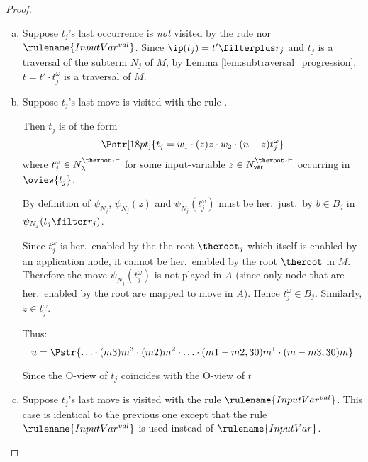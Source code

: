 \begin{proof}
\begin{enumerate}[$\bullet$]
\begin{enumerate}
\begin{enumerate}[-]
    \begin{enumerate}[(a)]
    \item  Suppose $t_j$'s last occurrence is \emph{not}  visited by the rule  nor $\rulename{InputVar^{val}}$.
         Since $\ip(t_j) = t' \filterplus r_j$ and
        $t_j$ is a traversal of the subterm $N_j$ of
        $M$, by Lemma
        \ref{lem:subtraversal_progression}, $t = t'
        \cdot t_j^\omega$ is a traversal of $M$.

    \item Suppose $t_j$'s last move is visited with the rule .

    Then $t_j$ is of the form
    $$\Pstr[18pt]{ t_j = w_1 \cdot (z)z \cdot w_2 \cdot (n-z){t_j^\omega}}$$
where $t_j^\omega \in N_\lambda^{\theroot_j\vdash}$
for some input-variable $z \in
N^{\theroot_j\vdash}_{\sf var}$ occurring in
$\oview{t_j}$.

By definition of $\psi_{N_j}$, $\psi_{N_j}(z)$ and
$\psi_{N_j}(t_j^\omega)$ must be her.\ just.\ by $b
\in B_j$ in $\psi_{N_j}(t_j\filter r_j)$.



Since $t_j^\omega$ is her.\ enabled by the the root
$\theroot_j$ which itself is enabled by an
application node, it cannot be her.\ enabled by the
root $\theroot$ in $M$. Therefore the move
$\psi_{N_j}(t_j^\omega)$ is not played in $A$ (since
only node that are her.\ enabled by the root are
mapped to move in $A$). Hence $t_j^\omega \in B_j$.
Similarly, $z \in t_j^\omega$.

Thus:
$$u = \Pstr{ \ldots \cdot (m3){m^3} \cdot
                (m2){m^2} \cdot \ldots \cdot
                (m1-m2,30){m^1} \cdot (m-m3,30){m} } $$






Since the O-view of $t_j$ coincides with the O-view
of $t$

    \item Suppose $t_j$'s last move is visited with the rule $\rulename{InputVar^{val}}$.
    This case is identical to the previous one
    except that the rule $\rulename{InputVar^{val}}$
    is used instead of $\rulename{InputVar}$.
    \end{enumerate}



\end{enumerate}
\end{enumerate}
\end{enumerate}
\end{proof}
